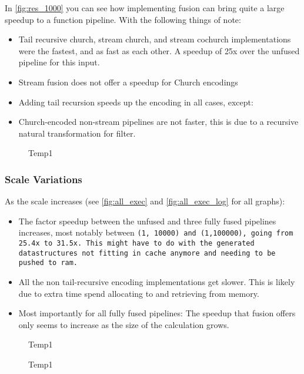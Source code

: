 In \autoref{fig:res_1000} you can see how implementing fusion can bring quite a large speedup to a function pipeline.
With the following things of note:
\begin{itemize}[noitemsep]
    \item Tail recursive church, stream church, and stream cochurch implementations were the fastest, and as fast as each other. A speedup of 25x over the unfused pipeline for this input.
    \item Stream fusion does not offer a speedup for Church encodings
    \item Adding tail recursion speeds up the encoding in all cases, except:
    \item Church-encoded non-stream pipelines are not faster, this is due to a recursive natural transformation for filter.
\end{itemize}

\begin{figure}[h] %
    
    \caption{Temp1}
    \label{fig:res_1000}
\end{figure}

\subsubsection{Scale Variations}\label{sec:scale_var}
As the scale increases (see \autoref{fig:all_exec} and \autoref{fig:all_exec_log} for all graphs):
\begin{itemize}[noitemsep]
    \item The factor speedup between the unfused and three fully fused pipelines increases, most notably between \tt{(1, 10000)} and \tt{(1,100000)}, going from 25.4x to 31.5x.
    This might have to do with the generated datastructures not fitting in cache anymore and needing to be pushed to ram.
    \item All the non tail-recursive encoding implementations get slower. This is likely due to extra time spend allocating to and retrieving from memory.
    \item Most importantly for all fully fused pipelines: The speedup that fusion offers only seems to increase as the size of the calculation grows.
\end{itemize}

\begin{figure}[h]
    
    \caption{Temp1}
    \label{fig:results1}
\end{figure}
\begin{figure}[h]
    
    \caption{Temp1}
    \label{fig:results2}
\end{figure}
